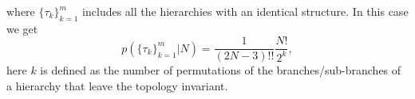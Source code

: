 \documentclass[12pt]{article}
\begin{document}
where $\{\tau_k\}_{k=1}^m $ includes all the hierarchies with an identical structure. In this case we get
\begin{equation}
 p( \{\tau_k\}_{k=1}^m | N ) = \frac{1}{(2N-3)!!} \frac{N!}{2^k},
\end{equation}
here $k$ is defined as the number of permutations of the branches/sub-branches of a hierarchy that leave the topology invariant.





\end{document}
